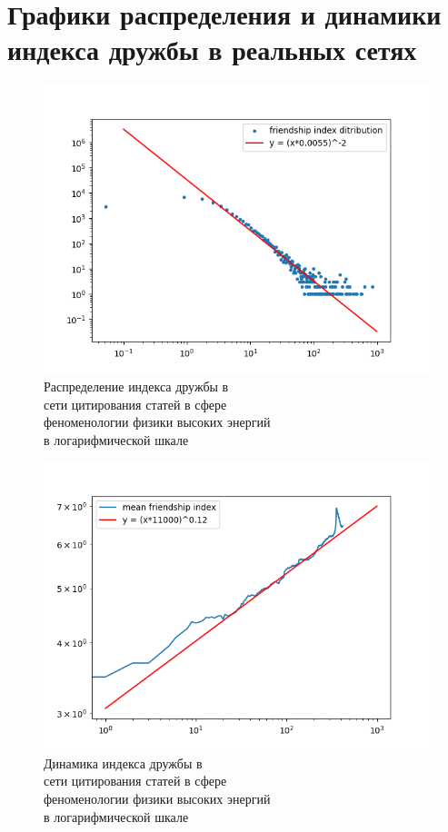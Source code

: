 \documentclass[bachelor, och, diploma]{SCWorks}
\begin{document}
\section{Графики распределения и динамики индекса дружбы в реальных сетях}\label{app:real}
\begin{figure}[!ht]
    \centering
    \includegraphics[scale=0.5]{diploma_results/static_real_log/Cit-HepPh.png}
    \caption{Распределение индекса дружбы  в\\ сети цитирования статей в сфере \\феноменологии физики высоких энергий\\ в логарифмической шкале}
\end{figure}
\begin{figure}[!ht]
    \centering
    \includegraphics[scale=0.5]{diploma_results/dynamic_real_log/Cit-HepPh_mean.png}
    \caption{Динамика индекса дружбы  в\\ сети цитирования статей в сфере \\феноменологии физики высоких энергий\\ в логарифмической шкале}
\end{figure}
\end{document}
